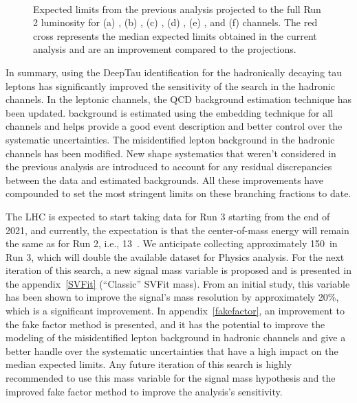 \begin{figure}[htbp!]
  \hspace{0.5cm}
  \\
  \caption{Expected limits from the previous analysis projected to the full Run 2 luminosity for (a) \muhad, (b) \ehad, (c) \mue, (d) \emu, (e) \mutau, and (f) \etau channels. The red cross represents the median expected limits obtained in the current analysis and are an improvement compared to the projections.}
  \label{fig:projections}
\end{figure}

In summary, using the DeepTau identification for the hadronically decaying tau leptons has significantly improved the sensitivity of the search in the hadronic channels. In the leptonic channels, the QCD background estimation technique has been updated. \Ztt background is estimated using the embedding technique for all channels and helps provide a good event description and better control over the systematic uncertainties. The misidentified lepton background in the hadronic channels has been modified. New shape systematics that weren't considered in the previous analysis are introduced to account for any residual discrepancies between the data and estimated backgrounds. All these improvements have compounded to set the most stringent limits on these branching fractions to date.

The LHC is expected to start taking data for Run 3 starting from the end of 2021, and currently, the expectation is that the center-of-mass energy will remain the same as for Run 2, i.e., 13~\TeV. We anticipate collecting approximately 150~\fb in Run 3, which will double the available dataset for Physics analysis. For the next iteration of this search, a new signal mass variable is proposed and is presented in the appendix~\ref{SVFit} (``Classic'' SVFit mass). From an initial study, this variable has been shown to improve the signal's mass resolution by approximately 20\%, which is a significant improvement. In appendix~\ref{fakefactor}, an improvement to the fake factor method is presented, and it has the potential to improve the modeling of the misidentified lepton background in hadronic channels and give a better handle over the systematic uncertainties that have a high impact on the median expected limits. Any future iteration of this search is highly recommended to use this mass variable for the signal mass hypothesis and the improved fake factor method to improve the analysis's sensitivity.
